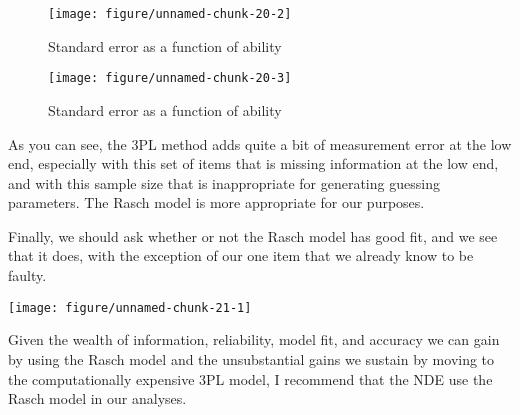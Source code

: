 \documentclass{article}\usepackage[]{graphicx}\usepackage[]{color}
\makeatletter
\def\maxwidth{ %
  \ifdim\Gin@nat@width>\linewidth
    \linewidth
  \else
    \Gin@nat@width
  \fi
}
\newenvironment{kframe}{%
 \def\at@end@of@kframe{}%
 \ifinner\ifhmode%
  \def\at@end@of@kframe{\end{minipage}}%
  \begin{minipage}{\columnwidth}%
 \fi\fi%
 \def\FrameCommand##1{\hskip\@totalleftmargin \hskip-\fboxsep
 \colorbox{shadecolor}{##1}\hskip-\fboxsep
     \hskip-\linewidth \hskip-\@totalleftmargin \hskip\columnwidth}%
 \MakeFramed {\advance\hsize-\width
   \@totalleftmargin\z@ \linewidth\hsize
   \@setminipage}}%
 {\par\unskip\endMakeFramed%
 \at@end@of@kframe}
\newenvironment{knitrout}{}{} %
\makeatother
\begin{document}
\begin{enumerate}
\begin{knitrout}
\begin{figure}[H]

{\centering \texttt{[image: figure/unnamed-chunk-20-2]} 

}

\caption[Standard error as a function of ability]{Standard error as a function of ability}\label{fig:unnamed-chunk-202}
\end{figure}

\begin{figure}[H]

{\centering \texttt{[image: figure/unnamed-chunk-20-3]} 

}

\caption[Standard error as a function of ability]{Standard error as a function of ability}\label{fig:unnamed-chunk-203}
\end{figure}


\end{knitrout}
\raggedright
As you can see, the 3PL method adds quite a bit of measurement error at the low end, especially with this set of items that is missing information at the low end, and with this sample size that is inappropriate for generating guessing parameters. The Rasch model is more appropriate for our purposes. 
\raggedright

Finally, we should ask whether or not the Rasch model has good fit, and we see that it does, with the exception of our one item that we already know to be faulty.

\centering
\begin{knitrout}
\color{fgcolor}\begin{kframe}


{\ttfamily\noindent\bfseries{}}\end{kframe}

{\centering \texttt{[image: figure/unnamed-chunk-21-1]} 

}



\end{knitrout}
\raggedright
Given the wealth of information, reliability, model fit, and accuracy we can gain by using the Rasch model and the unsubstantial gains we sustain by moving to the computationally expensive 3PL model, I recommend that the NDE use the Rasch model in our analyses.

\end{enumerate}
\end{document}
